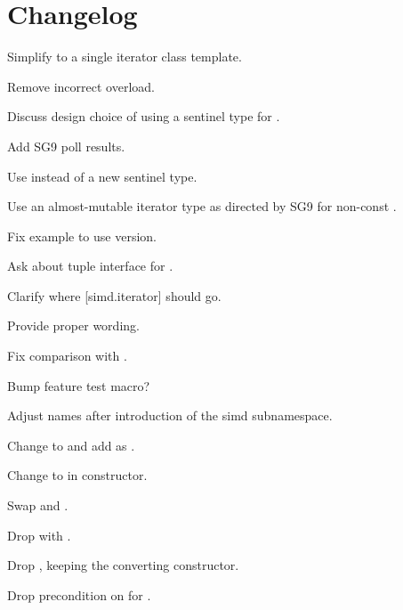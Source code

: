 \section{Changelog}
\begin{revision}
\item Simplify to a single iterator class template.
\item Remove incorrect  overload.
\item Discuss design choice of using a sentinel type for .
\end{revision}

\begin{revision}
\item Add SG9 poll results.
\item Use  instead of a new sentinel type.
\item Use an almost-mutable iterator type as directed by SG9 for
  non-const .
\item Fix  example to use  version.
\end{revision}

\begin{revision}
\item Ask about tuple interface for .
\item Clarify where [simd.iterator] should go.
\item Provide proper wording.
\item Fix \code{<=>} comparison with .
\item Bump feature test macro?
\end{revision}

\begin{revision}
\item Adjust names after introduction of the simd subnamespace.
\end{revision}

\begin{revision}
\item Change  to  and add  as .
\item Change  to \textit{} in constructor.
\item Swap  and .
\item Drop  with .
\item Drop , keeping the converting constructor.
\item Drop precondition on \textit{} for .
\end{revision}
